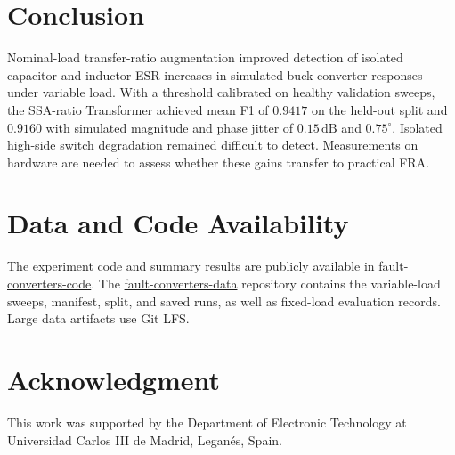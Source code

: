 \documentclass[journal]{IEEEtran}
\begin{document}
\section{Conclusion}\label{sec:8}

Nominal-load transfer-ratio augmentation improved detection of isolated capacitor and inductor ESR increases in simulated buck converter responses under variable load. With a threshold calibrated on healthy validation sweeps, the SSA-ratio Transformer achieved mean F1 of $0.9417$ on the held-out split and $0.9160$ with simulated magnitude and phase jitter of $0.15\,\mathrm{dB}$ and $0.75^\circ$. Isolated high-side switch degradation remained difficult to detect. Measurements on hardware are needed to assess whether these gains transfer to practical FRA.

\section*{Data and Code Availability}

The experiment code and summary results are publicly available in \href{https://github.com/igmsalinas/fault-converters-code}{fault-converters-code}. The \href{https://github.com/igmsalinas/fault-converters-data}{fault-converters-data} repository contains the variable-load sweeps, manifest, split, and saved runs, as well as fixed-load evaluation records. Large data artifacts use Git LFS.

\section*{Acknowledgment}

This work was supported by the Department of Electronic Technology at Universidad Carlos III de Madrid, Legan\'es, Spain.



\end{document}
